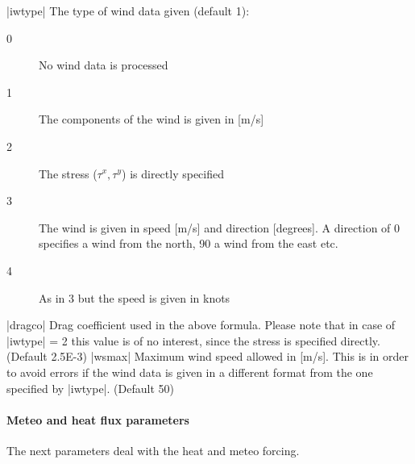 |iwtype|      The type of wind data given (default 1):
\begin{description}
\item[0] No wind data is processed
\item[1] The components of the wind is given in [m/s]
\item[2] The stress ($\tau^x,\tau^y$) is directly specified
\item[3] The wind is given in speed [m/s] and direction
[degrees]. A direction of 0\degrees{} specifies
a wind from the north, 90\degrees{} a wind
from the east etc.
\item[4] As in 3 but the speed is given in knots
\end{description}
\par
|dragco|      Drag coefficient used in the above formula. 
Please note that in case
of |iwtype| = 2 this value is of no interest, since the
stress is specified directly. (Default 2.5E-3)
|wsmax|       Maximum wind speed allowed in [m/s]. This is in order to avoid
errors if the wind data is given in a different format
from the one specified by |iwtype|. (Default 50)

\par

\paragraph{Meteo and heat flux parameters}
The next parameters deal with the heat and meteo forcing.


